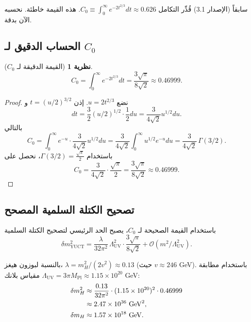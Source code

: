 \documentclass[11pt,a4paper]{article}
\newcommand{\Mpl}{M_{\mathrm{Pl}}}
\newcommand{\LUV}{\Lambda_{\mathrm{UV}}}
\newtheorem{theorem}{نظرية}[section]
\theoremstyle{remark}
\begin{document}
\begin{otherlanguage}{arabic}
		سابقاً (الإصدار 3.1) قُدِّر التكامل \(C_0 \equiv \int_0^{\infty} e^{-2t^{2/3}} dt \approx 0.626\). هذه القيمة خاطئة. نحسبه الآن بدقة.
		
		\subsection{الحساب الدقيق لـ \(C_0\)}
		\begin{theorem}[القيمة الدقيقة لـ \(C_0\)]
			\label{thm:C0}
			\[
			C_0 = \int_0^{\infty} e^{-2t^{2/3}} dt = \frac{3\sqrt{\pi}}{8\sqrt{2}} \approx 0.46999.
			\]
		\end{theorem}
		
		\begin{proof}
			نضع \(u = 2t^{2/3}\). إذن \(t = (u/2)^{3/2}\) و
			\[
			dt = \frac{3}{2} (u/2)^{1/2} \cdot \frac{1}{2} du = \frac{3}{4\sqrt{2}} u^{1/2} du.
			\]
			بالتالي
			\[
			C_0 = \int_0^{\infty} e^{-u} \cdot \frac{3}{4\sqrt{2}} u^{1/2} du = \frac{3}{4\sqrt{2}} \int_0^{\infty} u^{1/2} e^{-u} du = \frac{3}{4\sqrt{2}} \, \Gamma(3/2).
			\]
			باستخدام \(\Gamma(3/2) = \frac{\sqrt{\pi}}{2}\)، نحصل على
			\[
			C_0 = \frac{3}{4\sqrt{2}} \cdot \frac{\sqrt{\pi}}{2} = \frac{3\sqrt{\pi}}{8\sqrt{2}} \approx 0.46999.
			\]
		\end{proof}
		
		\subsection{تصحيح الكتلة السلمية المصحح}
		باستخدام القيمة الصحيحة لـ \(C_0\)، يصبح الحد الرئيسي لتصحيح الكتلة السلمية
		\begin{equation}
			\boxed{\delta m^2_{\mathrm{YUCT}} = \frac{\lambda}{32\pi^2}\,\LUV^2 \cdot \frac{3\sqrt{\pi}}{8\sqrt{2}} + \mathcal{O}(m^2/\LUV^2)}.
			\label{eq:scalar_corrected}
		\end{equation}
		
		بالنسبة لبوزون هيغز، \(\lambda = m_H^2/(2v^2) \approx 0.13\) (حيث \(v \approx 246\) GeV). باستخدام مطابقة مقياس بلانك \(\LUV = 3\pi\Mpl \approx 1.15\times 10^{20}\) GeV:
		\begin{align}
			\delta m^2_H &\approx \frac{0.13}{32\pi^2} \cdot (1.15\times 10^{20})^2 \cdot 0.46999 \notag\\
			&\approx 2.47 \times 10^{36}\ \mathrm{GeV}^2, \notag\\
			\delta m_H &\approx 1.57 \times 10^{18}\ \mathrm{GeV}.
			\label{eq:planck_correction}
		\end{align}
		

\end{otherlanguage}
\end{document}
